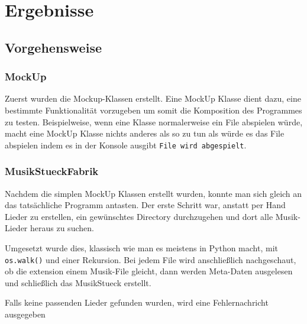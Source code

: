 
\section{Ergebnisse}
\label{sec:Ergebnisse}

\subsection{Vorgehensweise}
\subsubsection{MockUp}
Zuerst wurden die Mockup-Klassen erstellt. Eine MockUp Klasse dient dazu, eine bestimmte Funktionalität vorzugeben um somit die Komposition des Programmes zu testen. Beispielweise, wenn eine Klasse normalerweise ein File abspielen würde, macht eine MockUp Klasse nichts anderes als so zu tun als würde es das File abspielen indem es in der Konsole ausgibt \verb|File wird abgespielt|.

\subsubsection{MusikStueckFabrik}
Nachdem die simplen MockUp Klassen erstellt wurden, konnte man sich gleich an das tatsächliche Programm antasten. Der erste Schritt war, anstatt per Hand Lieder zu erstellen, ein gewünschtes Directory durchzugehen und dort alle Musik-Lieder heraus zu suchen. 

Umgesetzt wurde dies, klassisch wie man es meistens in Python macht, mit \verb|os.walk()| und einer Rekursion. Bei jedem File wird anschließlich nachgeschaut, ob die extension einem Musik-File gleicht, dann werden Meta-Daten ausgelesen und schließlich das MusikStueck erstellt. 

Falls keine passenden Lieder gefunden wurden, wird eine Fehlernachricht ausgegeben

